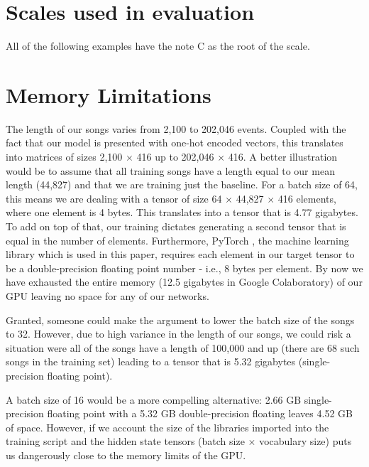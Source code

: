 \documentclass[a4paper]{book}
\begin{document}
\chapter{Scales used in evaluation} \label{appendix:scales}

All of the following examples have the note C as the root of the scale.
\begin{figure}[ht]
    \centering
    \def\svgwidth{\linewidth}
    
\end{figure}

\begin{figure}[ht]
    \centering
    \def\svgwidth{\linewidth}
    
\end{figure}

\chapter{Memory Limitations} \label{appendix:memory}

The length of our songs varies from 2,100 to 202,046 events. Coupled with the fact that our model is presented with one-hot encoded vectors, this translates into matrices of sizes 2,100 $\times$ 416 up to 202,046 $\times$ 416. A better illustration would be to assume that all training songs have a length equal to our mean length (44,827) and that we are training just the baseline. For a batch size of 64, this means we are dealing with a tensor of size 64 $\times$ 44,827 $\times$ 416 elements, where one element is 4 bytes. This translates into a tensor that is 4.77 gigabytes. To add on top of that, our training dictates generating a second tensor that is equal in the number of elements. Furthermore, PyTorch \parencite{paszke_automatic_2017}, the machine learning library which is used in this paper, requires each element in our target tensor to be a double-precision floating point number - i.e., 8 bytes per element. By now we have exhausted the entire memory (12.5 gigabytes in Google Colaboratory) of our GPU leaving no space for any of our networks.

Granted, someone could make the argument to lower the batch size of the songs to 32. However, due to high variance in the length of our songs, we could risk a situation were all of the songs have a length of 100,000 and up (there are 68 such songs in the training set) leading to a tensor that is 5.32 gigabytes (single-precision floating point).

A batch size of 16 would be a more compelling alternative: 2.66 GB single-precision floating point with a 5.32 GB double-precision floating leaves 4.52 GB of space. However, if we account the size of the libraries imported into the training script and the hidden state tensors (batch size $\times$ vocabulary size) puts us dangerously close to the memory limits of the GPU.
\end{document}
